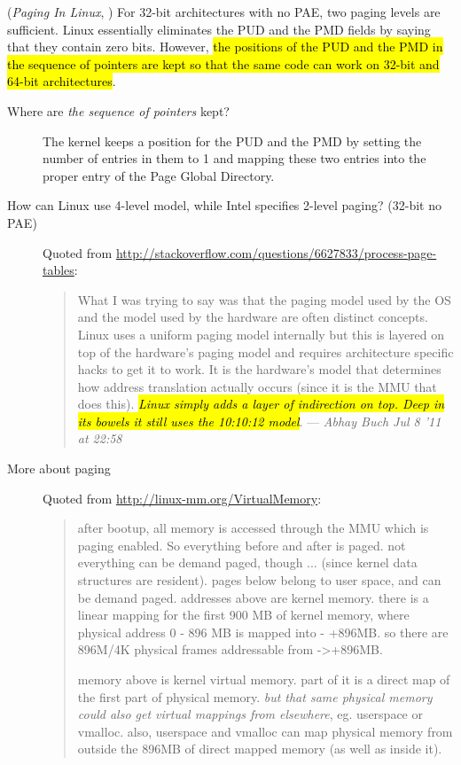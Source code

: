 (\emph{Paging In Linux}, \cite[Sec 2.5]{bovet2005understanding}) For 32-bit architectures
with no PAE, two paging levels are sufficient. Linux essentially eliminates the PUD and
the PMD fields by saying that they contain zero bits. However, \hl{the positions of the PUD
and the PMD in the sequence of pointers are kept so that the same code can work on 32-bit
and 64-bit architectures}.
\begin{description}
\item[Where are \emph{the sequence of pointers} kept?] The kernel keeps a position for the
  PUD and the PMD by setting the number of entries in them to 1 and mapping these two
  entries into the proper entry of the Page Global Directory.
\item[How can Linux use 4-level model, while Intel specifies 2-level paging? (32-bit
  no PAE)]
Quoted from \url{http://stackoverflow.com/questions/6627833/process-page-tables}:
\begin{quote}
  What I was trying to say was that the paging model used by the OS and the model used by
  the hardware are often distinct concepts. Linux uses a uniform paging model internally
  but this is layered on top of the hardware's paging model and requires architecture
  specific hacks to get it to work. It is the hardware's model that determines how address
  translation actually occurs (since it is the MMU that does this). \hl{\emph{Linux simply
    adds a layer of indirection on top. Deep in its bowels it still uses the 10:10:12
    model}}. --- \emph{Abhay Buch Jul 8 '11 at 22:58}
\end{quote}
\item[More about paging] Quoted from \url{http://linux-mm.org/VirtualMemory}:
\begin{quote}
  after bootup, all memory is accessed through the MMU which is paging enabled. So
  everything before and after  is paged. not everything can be demand
  paged, though ... (since kernel data structures are resident). pages below
   belong to user space, and can be demand paged. addresses above
   are kernel memory. there is a linear mapping for the first 900 MB of
  kernel memory, where physical address 0 - 896 MB is mapped into  -
  +896MB. so there are 896M/4K physical frames addressable from
  ->+896MB.

  memory above  is kernel virtual memory. part of it is a direct map of
  the first part of physical memory. \emph{but that same physical memory could also get
    virtual mappings from elsewhere}, eg. userspace or vmalloc. also, userspace and
  vmalloc can map physical memory from outside the 896MB of direct mapped memory (as well
  as inside it).


\end{quote}
\end{description}
